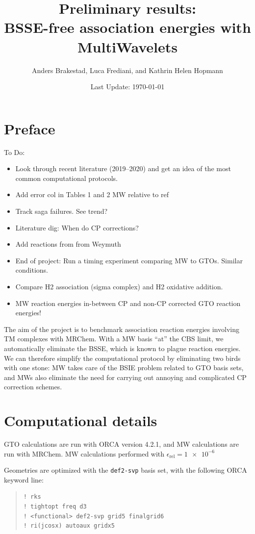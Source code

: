 \documentclass[11pt,a4paper]{article}
\author{Anders Brakestad, Luca Frediani, and Kathrin Helen Hopmann}
\title{Preliminary results: \\ BSSE-free association energies with MultiWavelets}
\date{Last Update: \today}
\begin{document}
	\maketitle
	\tableofcontents

\setcounter{secnumdepth}{2}

\section{Preface}

To Do:
\begin{itemize}
	\item Look through recent literature (2019--2020) and get an idea of the most common computational protocols. 
	\item Add error col in Tables 1 and 2 MW relative to ref
	\item Track saga failures. See trend?
	\item Literature dig: When do CP corrections?
	\item Add reactions from from Weymuth
	\item End of project: Run a timing experiment comparing MW to GTOs. Similar conditions.
	\item Compare H2 association (sigma complex) and H2 oxidative addition.
	\item MW reaction energies in-between CP and non-CP corrected GTO reaction energies!
\end{itemize}

The aim of the project is to benchmark association reaction energies involving TM complexes with MRChem.
With a MW basis ``at'' the CBS limit, we automatically eliminate the BSSE, which is known to plague reaction energies.
We can therefore simplify the computational protocol by eliminating two birds with one stone: MW takes care of the BSIE problem related to GTO basis sets, and MWs also eliminate the need for carrying out annoying and complicated CP correction schemes.


\section{Computational details}
GTO calculations are run with ORCA version 4.2.1, and MW calculations are run with MRChem.
MW calculations performed with $\epsilon_{\text{rel}} = \num{1e-6}$

Geometries are optimized with the \verb|def2-svp| basis set, with the following ORCA keyword line:

\begin{quote}
	\verb|! rks| \\
	\verb|! tightopt freq d3| \\
	\verb|! <functional> def2-svp grid5 finalgrid6| \\ 
	\verb|! ri(jcosx) autoaux gridx5|
\end{quote}
\end{document}

